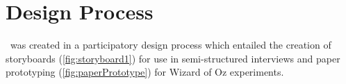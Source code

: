 \documentclass{chi-ext}
\begin{document}

\section{Design Process}
\drunkened\ was created in a participatory design process which entailed the creation of storyboards (\autoref{fig:storyboard1}) for use in semi-structured interviews and paper prototyping (\autoref{fig:paperPrototype}) for Wizard of Oz experiments.
\end{document}
